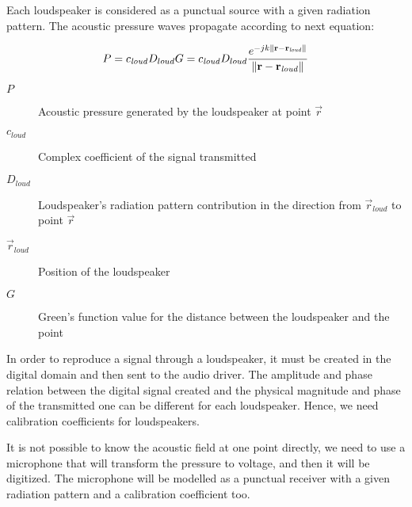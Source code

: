 Each loudspeaker is considered as a punctual source with a given radiation pattern. The acoustic pressure waves propagate according to next equation:

\begin{equation}
P = c_\mathit{loud} D_{loud} G = c_\mathit{loud} D_{loud} \frac{e^{-j k \left\| \mathbf{r} - \mathbf{r}_\mathit{loud} \right\|}}{\left\| \mathbf{r} - \mathbf{r}_\mathit{loud} \right\|}
\end{equation}

\begin{description}
	\item[$P$] Acoustic pressure generated by the loudspeaker at point $\vec{r}$
	\item[$c_\mathit{loud}$] Complex coefficient of the signal transmitted %
	\item[$D_{loud}$] Loudspeaker's radiation pattern contribution in the direction from $\vec{r}_\mathit{loud}$ to point $\vec{r}$%
	\item[$\vec{r}_{\mathit{loud}}$] Position of the loudspeaker
	\item[$G$] Green's function value for the distance between the loudspeaker and the point %
\end{description}

In order to reproduce a signal through a loudspeaker, it must be created in the digital domain and then sent to the audio driver. The amplitude and phase relation between the digital signal created and the physical magnitude and phase of the transmitted one can be different for each loudspeaker. Hence, we need calibration coefficients for loudspeakers.

It is not possible to know the acoustic field at one point directly, we need to use a microphone that will transform the pressure to voltage, and then it will be digitized. The microphone will be modelled as a punctual receiver with a given radiation pattern and a calibration coefficient too.

